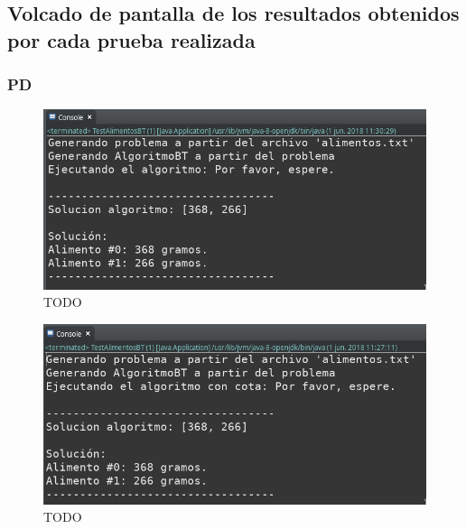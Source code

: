 \documentclass[a4paper,12pt]{article}
\begin{document}
\subsection{Volcado de pantalla de los resultados obtenidos por cada prueba realizada}
\subsubsection{PD}
\begin{figure}[H]
  \centering
  \includegraphics[scale=0.5]{btSinfiltro.png}
  \caption{TODO}
  \label{fig:pdsincota}
\end{figure}
\begin{figure}[H]
  \centering
  \includegraphics[scale=0.5]{btCota.png}
  \caption{TODO}
  \label{fig:pdconcota}
\end{figure}
\end{document}
